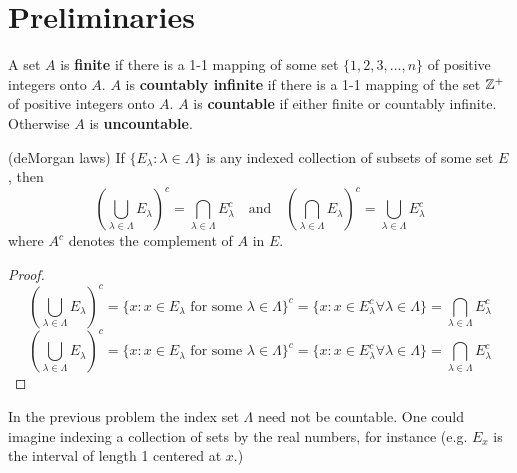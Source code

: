 \chapter{Preliminaries}
\begin{defn}\label{d:finite}%
A set $A$ is \textbf{finite} if there is a 1-1 mapping of some set $\{1, 2, 3, ..., n\}$ 
of positive integers onto $A$. $A$ is \textbf{countably infinite} if there is a 1-1 
mapping of the set $\mathbb{Z}^+$ of positive integers onto $A$. $A$ is \textbf{countable} 
if either finite or countably infinite. Otherwise $A$ is \textbf{uncountable}. 
\end{defn}

\begin{pblm}%
	(deMorgan laws) If $\{E_\lambda: \lambda \in \Lambda\}$ is any indexed collection of 
	subsets of some set $E$, then 
	\begin{equation*}
		\left(\bigcup\limits_{\lambda \in \Lambda} E_\lambda\right)^c = 
		\bigcap\limits_{\lambda \in \Lambda} E_\lambda^c ~~~ \text{ and }~~~
		\left(\bigcap\limits_{\lambda \in \Lambda} E_\lambda\right)^c = 
		\bigcup\limits_{\lambda \in \Lambda} E_\lambda^c 
	\end{equation*}
	where $A^c$ denotes the complement of $A$ in $E$. 
\begin{proof}
	\begin{equation*}
	\left(\bigcup\limits_{\lambda \in \Lambda} E_\lambda\right)^c = 
	\{x: x \in E_\lambda \text{ for some } \lambda \in \Lambda\}^c = 
	\{x: x \in E_\lambda^c \forall \lambda \in \Lambda\} = 
	\bigcap\limits_{\lambda \in \Lambda} E_\lambda^c
	\end{equation*}
	\begin{equation*}
	\left(\bigcup\limits_{\lambda \in \Lambda} E_\lambda\right)^c = 
	\{x: x \in E_\lambda \text{ for some } \lambda \in \Lambda\}^c = 
	\{x: x \in E_\lambda^c \forall \lambda \in \Lambda\} = 
	\bigcap\limits_{\lambda \in \Lambda} E_\lambda^c
	\end{equation*}
\end{proof}
\end{pblm}

\begin{rmk}%
	In the previous problem the index set $\Lambda$ need not be countable. One could 
	imagine indexing a collection of sets by the real numbers, for instance (e.g. 
	$E_x$ is the interval of length 1 centered at $x$.)
\end{rmk}

